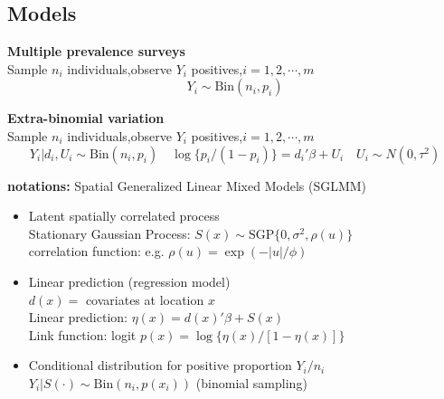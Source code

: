 \documentclass[11pt,compress,UTF8]{beamer}
\begin{document}
\subsection{Models}
\begin{frame}

{\color{red} \textbf{Multiple prevalence surveys}} \\
Sample $n_{i}$ individuals,observe $Y_{i}$ positives,$i=1,2,\cdots,m$
$$Y_{i}\sim \mathrm{Bin}(n_{i},p_{i})$$

{\color{red} \textbf{Extra-binomial variation}} \\
Sample $n_{i}$ individuals,observe $Y_{i}$ positives,$i=1,2,\cdots,m$
$$Y_{i}|d_{i},U_{i}\sim \mathrm{Bin}(n_{i},p_{i}) \quad 
\log\{p_{i}/(1-p_{i})\}=d_{i}'\beta+U_{i} \quad U_{i} \sim N(0,\tau^2)$$

\textbf{notations:} Spatial Generalized Linear Mixed Models (SGLMM)
\begin{itemize}
\item Latent spatially correlated process \\
Stationary Gaussian Process: $S(x) \sim \mathrm{SGP}\{0,\sigma^2,\rho(u)\} $ \\
correlation function: e.g. $\rho(u)=\exp(-|u|/\phi)$ 
\item Linear prediction (regression model)\\
$d(x)=$ covariates at location $x$\\
Linear prediction: $\eta(x)=d(x)'\beta + S(x)$ \\
Link function: logit $p(x)=\log\{\eta(x)/[1-\eta(x)]\}$ 
\item Conditional distribution for positive proportion $Y_{i}/n_{i}$\\
$Y_{i}|S(\cdot) \sim \mathrm{Bin}(n_{i},p(x_{i}))$ (binomial sampling)
\end{itemize}

\end{frame}
\end{document}
